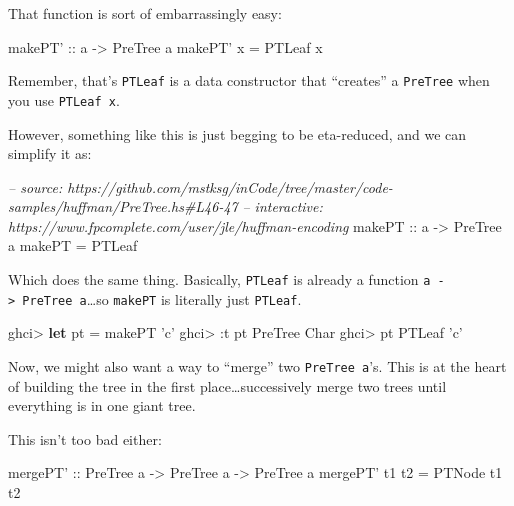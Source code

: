 \documentclass[]{article}
\newenvironment{Shaded}{}{}
\newcommand{\KeywordTok}[1]{\textcolor[rgb]{0.00,0.44,0.13}{\textbf{#1}}}
\newcommand{\DataTypeTok}[1]{\textcolor[rgb]{0.56,0.13,0.00}{#1}}
\newcommand{\CharTok}[1]{\textcolor[rgb]{0.25,0.44,0.63}{#1}}
\newcommand{\CommentTok}[1]{\textcolor[rgb]{0.38,0.63,0.69}{\textit{#1}}}
\newcommand{\OtherTok}[1]{\textcolor[rgb]{0.00,0.44,0.13}{#1}}
\newcommand{\FunctionTok}[1]{\textcolor[rgb]{0.02,0.16,0.49}{#1}}
\newcommand{\NormalTok}[1]{#1}
\begin{document}
That function is sort of embarrassingly easy:

\begin{Shaded}
\begin{Highlighting}[]
\OtherTok{makePT' ::}\NormalTok{ a }\OtherTok{->} \DataTypeTok{PreTree}\NormalTok{ a}
\NormalTok{makePT' x }\FunctionTok{=} \DataTypeTok{PTLeaf}\NormalTok{ x}
\end{Highlighting}
\end{Shaded}

Remember, that's \texttt{PTLeaf} is a data constructor that ``creates'' a
\texttt{PreTree} when you use \texttt{PTLeaf\ x}.

However, something like this is just begging to be eta-reduced, and we can
simplify it as:

\begin{Shaded}
\begin{Highlighting}[]
\CommentTok{-- source: https://github.com/mstksg/inCode/tree/master/code-samples/huffman/PreTree.hs#L46-47}
\CommentTok{-- interactive: https://www.fpcomplete.com/user/jle/huffman-encoding}
\OtherTok{makePT ::}\NormalTok{ a }\OtherTok{->} \DataTypeTok{PreTree}\NormalTok{ a}
\NormalTok{makePT }\FunctionTok{=} \DataTypeTok{PTLeaf}
\end{Highlighting}
\end{Shaded}

Which does the same thing. Basically, \texttt{PTLeaf} is already a function
\texttt{a\ -\textgreater{}\ PreTree\ a}\ldots{}so \texttt{makePT} is literally
just \texttt{PTLeaf}.

\begin{Shaded}
\begin{Highlighting}[]
\NormalTok{ghci}\FunctionTok{>} \KeywordTok{let}\NormalTok{ pt }\FunctionTok{=}\NormalTok{ makePT }\CharTok{'c'}
\NormalTok{ghci}\FunctionTok{>} \FunctionTok{:}\NormalTok{t pt}
\DataTypeTok{PreTree} \DataTypeTok{Char}
\NormalTok{ghci}\FunctionTok{>}\NormalTok{ pt}
\DataTypeTok{PTLeaf} \CharTok{'c'}
\end{Highlighting}
\end{Shaded}

Now, we might also want a way to ``merge'' two \texttt{PreTree\ a}'s. This is at
the heart of building the tree in the first place\ldots{}successively merge two
trees until everything is in one giant tree.

This isn't too bad either:

\begin{Shaded}
\begin{Highlighting}[]
\OtherTok{mergePT' ::} \DataTypeTok{PreTree}\NormalTok{ a }\OtherTok{->} \DataTypeTok{PreTree}\NormalTok{ a }\OtherTok{->} \DataTypeTok{PreTree}\NormalTok{ a}
\NormalTok{mergePT' t1 t2 }\FunctionTok{=} \DataTypeTok{PTNode}\NormalTok{ t1 t2}
\end{Highlighting}
\end{Shaded}
\end{document}
